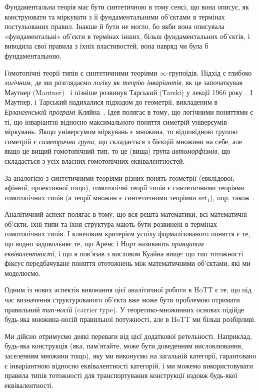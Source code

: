 \documentclass[12pt]{article}
\begin{document}
Фундаментальна теорія має бути синтетичною в тому сенсі, що вона описує, як конструювати та міркувати з її фундаментальними об'єктами в термінах постульованих правил. Інакше й бути не могло, бо якби вона описувала «фундаментальні» об'єкти в термінах інших, більш фундаментальних об'єктів, і виводила свої правила з їхніх властивостей, вона навряд чи була б фундаментальною.

Гомотопічні теорії типів є синтетичними теоріями $\infty$-групоїдів. Підхід є глибоко \emph{логічним}, де ми розглядаємо \emph{логіку як теорію інваріантів}, як це започаткував Маутнер (Mautner)~\cite{Mautner1946} і пізніше розвинув Тарський (Tarski) у лекції 1966 року~\cite{Tarski1986}. І Маутнер, і Тарський надихалися підходом до геометрії, викладеним в \emph{Ерлангенській програмі} Кляйна~\cite{Klein1872}. Ідея полягає в тому, що логічними поняттями є ті, що інваріантні відносно максимального поняття симетрій універсумів міркувань. Якщо універсумом міркувань є множина, то відповідною групою симетрій є \emph{симетрична група}, що складається з бієкцій множини на себе, але якщо це вищий гомотопічний тип, то це (вища) група \emph{автоморфізмів}, що складається з усіх власних гомотопічних еквівалентностей.

За аналогією з синтетичними теоріями різних понять геометрії (евклідової, афінної, проективної тощо), гомотопічні теорії типів є синтетичними теоріями гомотопічних типів (а теорії множин є синтетичними теоріями set$_1$), пор. також~\cite{Awodey2018}.

Аналітичний аспект полягає в тому, що вся решта математики, всі математичні об'єкти, їхні типи та їхня структура мають бути розвинені в термінах гомотопічних типів. І ключовим критерієм успіху формалізованого поняття є те, що водно задовольняє те, що Аренс і Норт називають \emph{принципом еквівалентності}, і що я пов'язав з висловом Куайна вище: що тип тотожності фіксує передбачуване поняття ототожнень між математичними об'єктами, які ми моделюємо.

Одним із нових аспектів виконання цієї аналітичної роботи в HoTT є те, що під час визначення структурованого об'єкта вже може бути проблемою отримати правильний \emph{тип-носій} (carrier type). У теоретико-множинних основах підійде будь-яка множина-носій правильної потужності, але в HoTT ми більш розбірливі.

Ми дійсно отримуємо деякі переваги від цієї додаткової ретельності. Наприклад, будь-яка конструкція (яка, пам'ятайте, може бути доведенням висловлювання, заселенням множини тощо), яку ми виконуємо на загальній категорії, гарантовано є інваріантною відносно еквівалентності категорій, і ми можемо використовувати правила типів тотожності для транспортування конструкції вздовж будь-якої еквівалентності.
\end{document}
